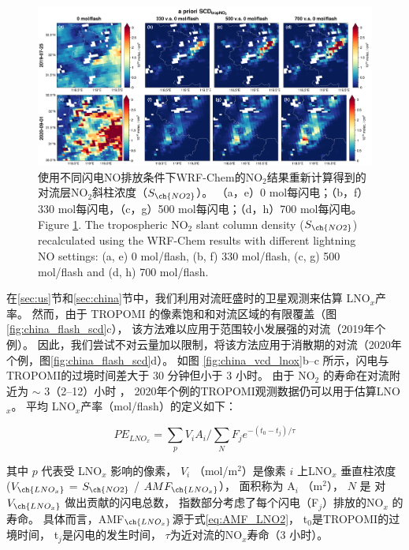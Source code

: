 \begin{figure}[!htbp]
    \includegraphics[width=17cm]{./figures/s5p_apriori_scd.png}
    \caption{使用不同闪电NO排放条件下WRF-Chem的NO$_2$结果重新计算得到的对流层NO$_2$斜柱浓度（$S_{\ch{NO2}}$）。
    （a，e）0 mol每闪电；（b，f）330 mol每闪电，（c，g）500 mol每闪电；（d，h）700 mol每闪电。\\
    Figure \ref{fig:s5p_apriori_scd}. The tropospheric NO$_2$ slant column density ($S_{\ch{NO2}}$) recalculated using the WRF-Chem results with different lightning NO settings: (a, e) 0 mol/flash, (b, f) 330 mol/flash, (c, g) 500 mol/flash and (d, h) 700 mol/flash.
    }
    \label{fig:s5p_apriori_scd}
\end{figure}

在\ref{sec:us}节和\ref{sec:china}节中，我们利用对流旺盛时的卫星观测来估算 LNO$_x$产率。
然而，由于 TROPOMI 的像素饱和和对流区域的有限覆盖（图\ref{fig:china_flash_scd}c），
该方法难以应用于范围较小发展强的对流（2019年个例）。
因此，我们尝试不对云量加以限制，将该方法应用于消散期的对流（2020年个例，图\ref{fig:china_flash_scd}d）。
如图 \ref{fig:china_vcd_lnox}b--c 所示，闪电与TROPOMI的过境时间差大于 30 分钟但小于 3 小时。
由于 NO$_2$ 的寿命在对流附近为 $\sim$ 3（2--12）小时 \citep{Nault.2016}，
2020年个例的TROPOMI观测数据仍可以用于估算LNO$_x$。
平均 LNO$_x$产率（mol/flash）的定义如下：


\begin{equation} \label{eq:lnox}
PE_{LNO_x} = \sum_{p} V_i A_i / \sum_{N} F_j e^{-(t_0 - t_j) / \tau}
\end{equation}

其中 $p$ 代表受 LNO$_x$ 影响的像素，
$V_i$ （mol/m$^2$）是像素 $i$ 上LNO$_x$ 垂直柱浓度 ($V_{\ch{LNO_x}}$ = $S_{\ch{NO2}}$ / $AMF_{\ch{LNO_x}}$），
面积称为 A$_i$ （m$^2$），
$N$ 是 对 $V_{\ch{LNO_x}}$ 做出贡献的闪电总数，
指数部分考虑了每个闪电（F$_j$）排放的NO$_x$ 的寿命。
具体而言，AMF$_{\ch{LNO_x}}$源于式\ref{eq:AMF_LNO2}，
t$_0$是TROPOMI的过境时间，
t$_j$是闪电的发生时间，
$\tau$为近对流的NO$_x$寿命（3 小时）。

